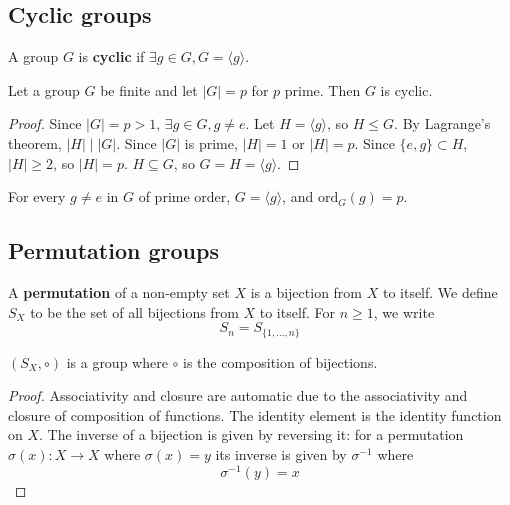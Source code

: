 \subsection{Cyclic groups}

\begin{definition}
	A group $G$ is \textbf{cyclic} if $\exists g \in G, G = \langle g \rangle$.
\end{definition}

\begin{theorem}
	Let a group $G$ be finite and let $|G| = p$ for $p$ prime. Then $G$ is cyclic.
\end{theorem}

\begin{proof}
	Since $|G| = p > 1$, $\exists g \in G, g \ne e$. Let $H = \langle g \rangle$, so $H \le G$. By Lagrange's theorem, $|H| \mid |G|$. Since $|G|$ is prime, $|H| = 1$ or $|H| = p$. Since $\{ e, g \} \subset H$, $|H| \ge 2$, so $|H| = p$. $H \subseteq G$, so $G = H = \langle g \rangle$.
\end{proof}

\begin{remark}
	For every $g \ne e$ in $G$ of prime order, $G = \langle g \rangle$, and $\text{ord}_G(g) = p$.
\end{remark}

\subsection{Permutation groups}

\begin{definition}
	A \textbf{permutation} of a non-empty set $X$ is a bijection from $X$ to itself. We define $S_X$ to be the set of all bijections from $X$ to itself. For $n \ge 1$, we write
	\[
		S_n = S_{\{ 1, \dots, n \}}
	\]
\end{definition}

\begin{lemma}
	$(S_X, \circ)$ is a group where $\circ$ is the composition of bijections.
\end{lemma}

\begin{proof}
	Associativity and closure are automatic due to the associativity and closure of composition of functions. The identity element is the identity function on $X$. The inverse of a bijection is given by reversing it: for a permutation $\sigma(x): X \rightarrow X$ where $\sigma(x) = y$ its inverse is given by $\sigma^{-1}$ where
	\[
		\sigma^{-1}(y) = x
	\]
\end{proof}

